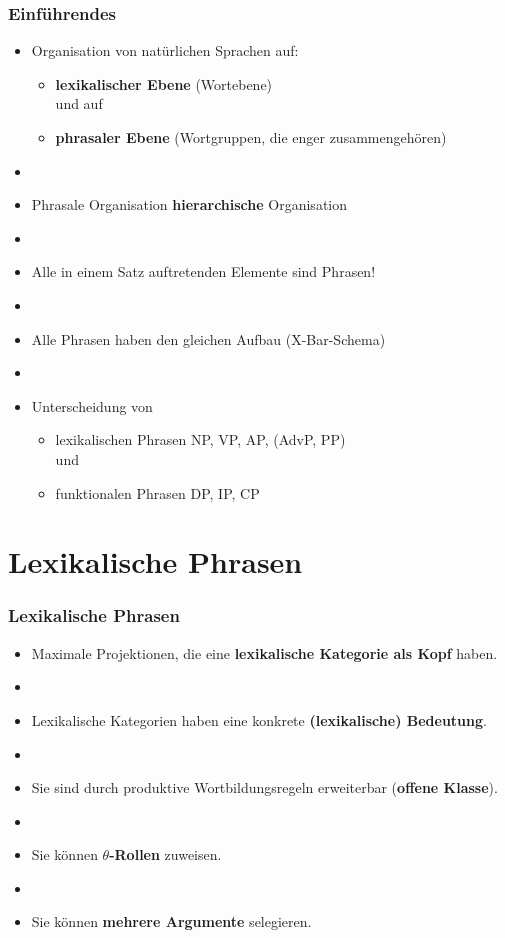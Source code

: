 \begin{frame}
\frametitle{Einführendes}

\begin{itemize}
	\item Organisation von natürlichen Sprachen auf:
	\begin{itemize}
		\item \textbf{lexikalischer Ebene} (Wortebene)\\
		und auf
		\item \textbf{phrasaler Ebene} (Wortgruppen, die enger zusammengehören)
	\end{itemize}
	\item[]
	\item Phrasale Organisation \ras \textbf{hierarchische} Organisation
	\item[]
	\item Alle in einem Satz auftretenden Elemente sind Phrasen!
	\item[]
	\item Alle Phrasen haben den gleichen Aufbau (X-Bar-Schema)
	\item[]
	\item Unterscheidung von
	\begin{itemize}
		\item lexikalischen Phrasen \ras NP, VP, AP, (AdvP, PP)\\
		und
		\item funktionalen Phrasen \ras DP, IP, CP
	\end{itemize}
\end{itemize}

\end{frame}


\section{Lexikalische Phrasen}

\begin{frame}
\frametitle{Lexikalische Phrasen}

\begin{itemize}
	\item Maximale Projektionen, die eine \textbf{lexikalische Kategorie als Kopf} haben.
	\item[]
	\item Lexikalische Kategorien haben eine konkrete \textbf{(lexikalische) Bedeutung}.
	\item[]
	\item Sie sind durch produktive Wortbildungsregeln erweiterbar (\textbf{offene Klasse}).
	\item[]
	\item Sie können \textbf{$\theta$-Rollen} zuweisen.
	\item[]
	\item Sie können \textbf{mehrere Argumente} selegieren.
\end{itemize}


\end{frame}


